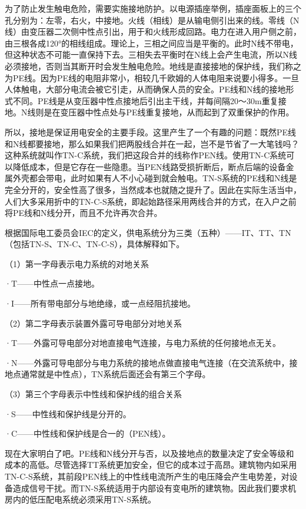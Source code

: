 \documentclass[12pt,UTF8]{ctexbook}
\begin{document}
为了防止发生触电危险，需要实施接地防护。以电源插座举例，插座面板上的三个孔分别为：左零，右火，中接地。火线（相线）是从输电侧引出来的线。零线（N线）由变压器二次侧中性点引出，用于和火线形成回路。电力在进入用户侧之前，由三根各成120°的相线组成。理论上，三相之间应当是平衡的。此时N线不带电，但这种状态不可能一直保持下去。三相失去平衡时在N线上会产生电流，所以N线必须接地，否则当其断开时会发生触电危险。地线是直接接地的保护线，我们称之为PE线。因为PE线的电阻非常小，相较几千欧姆的人体电阻来说要小得多。一旦人体触电，大部分电流会被它引走，从而确保人员的安全。PE线和N线的接地形式不同。PE线是从变压器中性点接地后引出主干线，并每间隔20～30m重复接地。N线则是在变压器中性点处与PE线重复接地，从而起到了双重保护的作用。

所以，接地是保证用电安全的主要手段。这里产生了一个有趣的问题：既然PE线和N线都要接地，那么如果我们把两股线合并在一起，岂不是节省了一大笔钱吗？这种系统就叫作TN-C系统，我们把这段合并的线称作PEN线。使用TN-C系统可以降低成本，但是它存在一些隐患。当PEN线路受损折断后，断点后端的设备金属外壳都会带电，此时如果有人不小心碰到就会触电。TN-S系统的PE线和N线是完全分开的，安全性高了很多，当然成本也就随之提升了。因此在实际生活当中，人们大多采用折中的TN-C-S系统，即起始路径采用两线合并的方式，在入户之前将PE线和N线分开，而且不允许再次合并。

根据国际电工委员会IEC的定义，供电系统分为三类（五种）——IT、TT、TN（包括TN-S、TN-C、TN-C-S），具体解释如下。

（1）第一字母表示电力系统的对地关系

·T——中性点一点接地。

·I——所有带电部分与地绝缘，或一点经阻抗接地。

（2）第二字母表示装置外露可导电部分对地关系

·T——外露可导电部分对地直接电气连接，与电力系统的任何接地点无关。

·N——外露可导电部分与电力系统的接地点做直接电气连接（在交流系统中，接地点通常就是中性点），TN系统后面还会有第三个字母。

（3）第三个字母表示中性线和保护线的组合关系

·S——中性线和保护线是分开的。

·C——中性线和保护线是合一的（PEN线）。

现在大家明白了吧。PE线和N线分开与否，以及接地点的数量决定了安全等级和成本的高低。尽管选择TT系统更加安全，但它的成本过于高昂。建筑物内如采用TN-C-S系统，其前段PEN线上的中性线电流所产生的电压降会产生电势差，对设备造成信号干扰。而TN-S系统适用于内部设有变电所的建筑物。因此我们要求机房内的低压配电系统必须采用TN-S系统。
\end{document}
